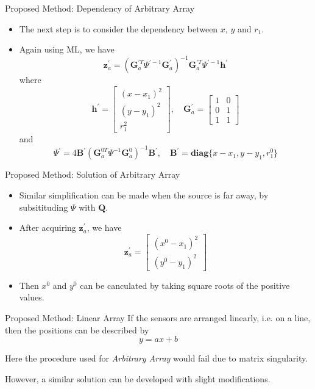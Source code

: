 \documentclass[10pt]{beamer}
\begin{document}
\begin{frame}{Proposed Method: Dependency of Arbitrary Array}
  \begin{itemize}
    \item The next step is to consider the dependency between $x$, $y$ and $r_1$.
    \item Again using ML, we have
          $$\mathbf{z}_a^{'}=(\mathbf{G}_a^{'T}\Psi^{'-1}\mathbf{G}_a^{'})^{-1}
                              \mathbf{G}_a^{'T}\Psi^{'-1}\mathbf{h}^{'}$$
          where
          $$\mathbf{h}^{'}=\begin{bmatrix}(x-x_1)^2\\(y-y_1)^2\\r_1^2\end{bmatrix},\quad
            \mathbf{G}_a^{'}=\begin{bmatrix}1&0\\0&1\\1&1\end{bmatrix}$$
          and
          $$\Psi^{'}=4\mathbf{B}^{'}(\mathbf{G}_a^{0T}\Psi^{-1}\mathbf{G}_a^0)^{-1}\mathbf{B}^{'},\quad
            \mathbf{B}^{'} = \textbf{diag} \{x-x_1,y-y_1,r_1^0\}$$
  \end{itemize}
\end{frame}

\begin{frame}{Proposed Method: Solution of Arbitrary Array}
  \begin{itemize}
    \item Similar simplification can be made when the source is far away,
          by subsitituding $\Psi$ with $\mathbf{Q}$.
    \item After acquiring $\mathbf{z}_a^{'}$, we have
          $$\mathbf{z}_a^{'}=
            \begin{bmatrix}(x^0-x_1)^2\\(y^0-y_1)^2\end{bmatrix}$$
    \item Then $x^0$ and $y^0$ can be canculated by taking square roots of the positive values.
  \end{itemize}
\end{frame}

\begin{frame}{Proposed Method: Linear Array}
  If the sensors are arranged linearly, i.e. on a line, then the positions
  can be described by $$y=ax+b$$

  Here the procedure used for \emph{Arbitrary Array} would fail due to matrix singularity.

  However, a similar solution can be developed with slight modifications.
\end{frame}
\end{document}
